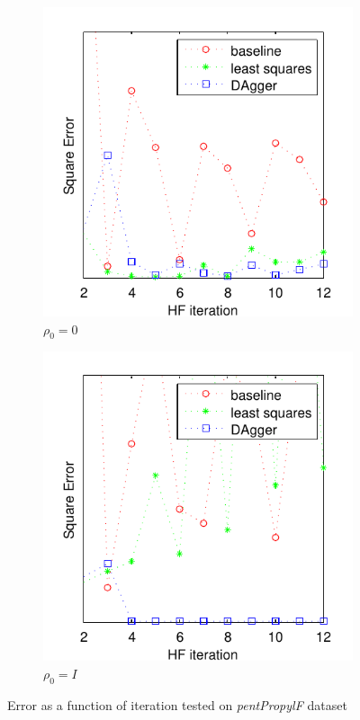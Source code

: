 \documentclass[twoside,11pt]{article}
\begin{document}
\begin{figure}[h!]
\centering
\begin{subfigure}{.5\textwidth}
  \centering
  \includegraphics[scale=0.7]{propylsub_pzero_test_12iter.pdf}
  \caption{$\rho_0 = 0$}
  \label{fig:propSub0}
\end{subfigure}%
\begin{subfigure}{.5\textwidth}
  \centering
  \includegraphics[scale=0.7]{propylsub_peye_test_12iter.pdf}
  \caption{$\rho_0 = I$}
  \label{fig:propSubI}
\end{subfigure}
\caption{Error as a function of iteration tested on \textit{pentPropylF} dataset}
\label{fig:testpropSub}
\end{figure}
\end{document}

